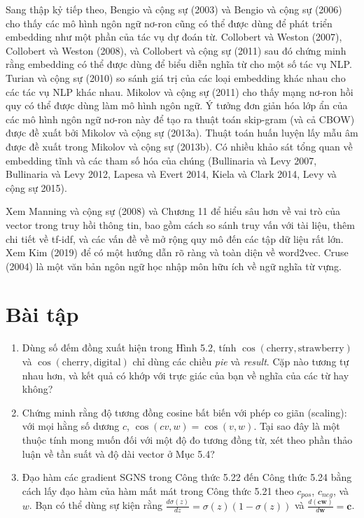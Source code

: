 Sang thập kỷ tiếp theo, Bengio và cộng sự (2003) và Bengio và cộng sự (2006) cho thấy các mô hình ngôn ngữ nơ-ron cũng có thể được dùng để phát triển embedding như một phần của tác vụ dự đoán từ. Collobert và Weston (2007), Collobert và Weston (2008), và Collobert và cộng sự (2011) sau đó chứng minh rằng embedding có thể được dùng để biểu diễn nghĩa từ cho một số tác vụ NLP. Turian và cộng sự (2010) so sánh giá trị của các loại embedding khác nhau cho các tác vụ NLP khác nhau. Mikolov và cộng sự (2011) cho thấy mạng nơ-ron hồi quy có thể được dùng làm mô hình ngôn ngữ. Ý tưởng đơn giản hóa lớp ẩn của các mô hình ngôn ngữ nơ-ron này để tạo ra thuật toán skip-gram (và cả CBOW) được đề xuất bởi Mikolov và cộng sự (2013a). Thuật toán huấn luyện lấy mẫu âm được đề xuất trong Mikolov và cộng sự (2013b). Có nhiều khảo sát tổng quan về embedding tĩnh và các tham số hóa của chúng (Bullinaria và Levy 2007, Bullinaria và Levy 2012, Lapesa và Evert 2014, Kiela và Clark 2014, Levy và cộng sự 2015).

Xem Manning và cộng sự (2008) và Chương 11 để hiểu sâu hơn về vai trò của vector trong truy hồi thông tin, bao gồm cách so sánh truy vấn với tài liệu, thêm chi tiết về tf-idf, và các vấn đề về mở rộng quy mô đến các tập dữ liệu rất lớn. Xem Kim (2019) để có một hướng dẫn rõ ràng và toàn diện về word2vec. Cruse (2004) là một văn bản ngôn ngữ học nhập môn hữu ích về ngữ nghĩa từ vựng.

\section*{Bài tập}

\begin{enumerate}
  \item[5.1] Dùng số đếm đồng xuất hiện trong Hình 5.2, tính $\cos(\text{cherry}, \text{strawberry})$ và $\cos(\text{cherry}, \text{digital})$ chỉ dùng các chiều \emph{pie} và \emph{result}. Cặp nào tương tự nhau hơn, và kết quả có khớp với trực giác của bạn về nghĩa của các từ hay không?
  \item[5.2] Chứng minh rằng độ tương đồng cosine bất biến với phép co giãn (scaling): với mọi hằng số dương $c$, $\cos(cv, w) = \cos(v, w)$. Tại sao đây là một thuộc tính mong muốn đối với một độ đo tương đồng từ, xét theo phần thảo luận về tần suất và độ dài vector ở Mục 5.4?
  \item[5.3] Đạo hàm các gradient SGNS trong Công thức 5.22 đến Công thức 5.24 bằng cách lấy đạo hàm của hàm mất mát trong Công thức 5.21 theo $c_{pos}$, $c_{neg}$, và $w$. Bạn có thể dùng sự kiện rằng $\frac{d\sigma(z)}{dz} = \sigma(z)(1-\sigma(z))$ và $\frac{d(\mathbf{c}\mathbf{w})}{d\mathbf{w}} = \mathbf{c}$.
\end{enumerate}

